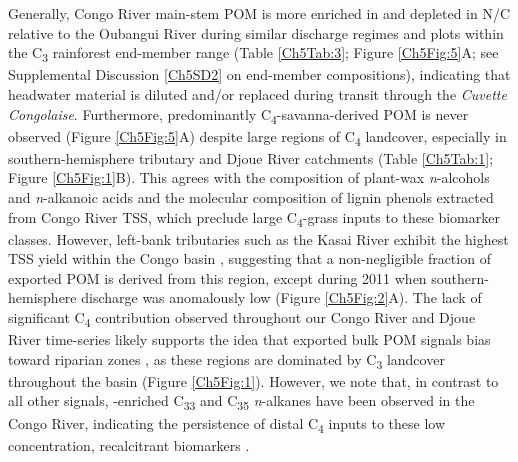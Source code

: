 Generally, Congo River main-stem POM is more enriched in  and depleted in N/C relative to the Oubangui River during similar discharge regimes \citep[Figure \ref{Ch5Fig:6}A--B;][]{Bouillon:2012cw,Bouillon:2014ko} and plots within the C\textsubscript{3} rainforest end-member range (Table \ref{Ch5Tab:3}; Figure \ref{Ch5Fig:5}A; see Supplemental Discussion \ref{Ch5SD2} on end-member compositions), indicating that headwater material is diluted and/or replaced during transit through the \textit{Cuvette Congolaise}. Furthermore, predominantly C\textsubscript{4}-savanna-derived POM is never observed (Figure \ref{Ch5Fig:5}A) despite large regions of C\textsubscript{4} landcover, especially in southern-hemisphere tributary and Djoue River catchments (Table \ref{Ch5Tab:1}; Figure \ref{Ch5Fig:1}B). This agrees with the  composition of plant-wax \textit{n}-alcohols and \textit{n}-alkanoic acids \citep{Hemingway:2016bq} and the molecular composition of lignin phenols \citep{Spencer:2016ho} extracted from Congo River TSS, which preclude large C\textsubscript{4}-grass inputs to these biomarker classes. However, left-bank tributaries such as the Kasai River exhibit the highest TSS yield within the Congo basin \citep{Laraque:2009fz}, suggesting that a non-negligible fraction of exported POM is derived from this region, except during 2011 when southern-hemisphere discharge was anomalously low (Figure \ref{Ch5Fig:2}A). The lack of significant C\textsubscript{4} contribution observed throughout our Congo River and Djoue River time-series likely supports the idea that exported bulk POM signals bias toward riparian zones \citep{Bouillon:2012cw}, as these regions are dominated by C\textsubscript{3} landcover throughout the basin (Figure \ref{Ch5Fig:1}). However, we note that, in contrast to all other signals, -enriched C\textsubscript{33} and C\textsubscript{35} \textit{n}-alkanes have been observed in the Congo River, indicating the persistence of distal C\textsubscript{4} inputs to these low concentration, recalcitrant biomarkers \citep{Hemingway:2016bq}.

